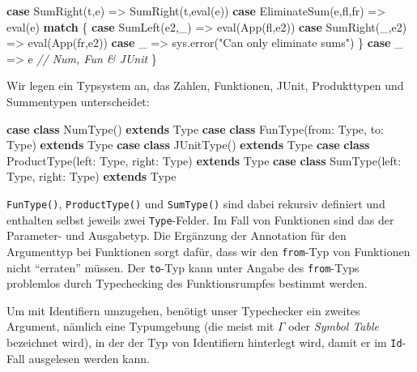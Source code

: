 \documentclass[]{article}
\newenvironment{Shaded}{}{}
\newcommand{\CommentTok}[1]{\textcolor[rgb]{0.38,0.63,0.69}{\textit{#1}}}
\newcommand{\FunctionTok}[1]{\textcolor[rgb]{0.02,0.16,0.49}{#1}}
\newcommand{\KeywordTok}[1]{\textcolor[rgb]{0.00,0.44,0.13}{\textbf{#1}}}
\newcommand{\NormalTok}[1]{#1}
\newcommand{\StringTok}[1]{\textcolor[rgb]{0.25,0.44,0.63}{#1}}
\begin{document}
\begin{Shaded}
\begin{Highlighting}[]
  \KeywordTok{case} \FunctionTok{SumRight}\NormalTok{(t,e) =\textgreater{} }\FunctionTok{SumRight}\NormalTok{(t,}\FunctionTok{eval}\NormalTok{(e))}
  \KeywordTok{case} \FunctionTok{EliminateSum}\NormalTok{(e,fl,fr) =\textgreater{} }\FunctionTok{eval}\NormalTok{(e) }\KeywordTok{match}\NormalTok{ \{}
    \KeywordTok{case} \FunctionTok{SumLeft}\NormalTok{(e2,\_) =\textgreater{} }\FunctionTok{eval}\NormalTok{(}\FunctionTok{App}\NormalTok{(fl,e2))}
    \KeywordTok{case} \FunctionTok{SumRight}\NormalTok{(\_,e2) =\textgreater{} }\FunctionTok{eval}\NormalTok{(}\FunctionTok{App}\NormalTok{(fr,e2))}
    \KeywordTok{case}\NormalTok{ \_ =\textgreater{} sys.}\FunctionTok{error}\NormalTok{(}\StringTok{"Can only eliminate sums"}\NormalTok{)}
\NormalTok{  \}}
  \KeywordTok{case}\NormalTok{ \_ =\textgreater{} e }\CommentTok{// Num, Fun \& JUnit}
\NormalTok{\}}
\end{Highlighting}
\end{Shaded}

Wir legen ein Typsystem an, das Zahlen, Funktionen, JUnit, Produkttypen
und Summentypen unterscheidet:

\begin{Shaded}
\begin{Highlighting}[]
\KeywordTok{case} \KeywordTok{class} \FunctionTok{NumType}\NormalTok{() }\KeywordTok{extends}\NormalTok{ Type}
\KeywordTok{case} \KeywordTok{class} \FunctionTok{FunType}\NormalTok{(from: Type, to: Type) }\KeywordTok{extends}\NormalTok{ Type}
\KeywordTok{case} \KeywordTok{class} \FunctionTok{JUnitType}\NormalTok{() }\KeywordTok{extends}\NormalTok{ Type}
\KeywordTok{case} \KeywordTok{class} \FunctionTok{ProductType}\NormalTok{(left: Type, right: Type) }\KeywordTok{extends}\NormalTok{ Type}
\KeywordTok{case} \KeywordTok{class} \FunctionTok{SumType}\NormalTok{(left: Type, right: Type) }\KeywordTok{extends}\NormalTok{ Type}
\end{Highlighting}
\end{Shaded}

\texttt{FunType()}, \texttt{ProductType()} und \texttt{SumType()} sind
dabei rekursiv definiert und enthalten selbst jeweils zwei
\texttt{Type}-Felder. Im Fall von Funktionen sind das der Parameter- und
Ausgabetyp. Die Ergänzung der Annotation für den Argumenttyp bei
Funktionen sorgt dafür, dass wir den \texttt{from}-Typ von Funktionen
nicht ``erraten'' müssen. Der \texttt{to}-Typ kann unter Angabe des
\texttt{from}-Typs problemlos durch Typechecking des Funktionsrumpfes
bestimmt werden.

Um mit Identifiern umzugehen, benötigt unser Typechecker ein zweites
Argument, nämlich eine Typumgebung (die meist mit \(\Gamma\) oder
\emph{Symbol Table} bezeichnet wird), in der der Typ von Identifiern
hinterlegt wird, damit er im \texttt{Id}-Fall ausgelesen werden kann.
\end{document}
